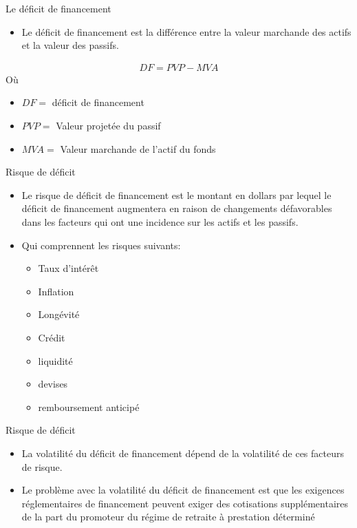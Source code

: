 \documentclass[10pt,a4paper]{beamer}
\begin{document}
\begin{frame}{Le déficit de financement}
\begin{itemize}[label=\bullet]
\item Le déficit de financement est la différence entre la valeur marchande des actifs et la valeur des passifs.
\end{itemize}
\begin{align*}
DF=PVP-MVA
\end{align*}
Où
\begin{itemize}[label=\bullet]
\item $DF=$ déficit de financement
\item $PVP=$ Valeur projetée du passif
\item $MVA=$ Valeur marchande de l'actif du fonds
\end{itemize}
\end{frame}

\begin{frame}{Risque de déficit}
\begin{itemize}[label=\bullet]
\item Le risque de déficit de financement est le montant en dollars par lequel le déficit de financement augmentera en raison de changements défavorables dans les facteurs qui ont une incidence sur les actifs et les passifs.
\item Qui comprennent les risques suivants:
\begin{itemize}[label=\bullet]
\item Taux d'intérêt
\item Inflation
\item Longévité
\item Crédit
\item liquidité
\item devises
\item remboursement anticipé
\end{itemize}
\end{itemize}
\end{frame}

\begin{frame}{Risque de déficit}
\begin{itemize}[label=\bullet]
\item La volatilité du déficit de financement dépend de la volatilité de ces facteurs de risque.
\item Le problème avec la volatilité du déficit de financement est que les exigences réglementaires de financement peuvent exiger des cotisations supplémentaires de la part du promoteur du régime de retraite à prestation déterminé
\end{itemize}
\end{frame}
\end{document}

